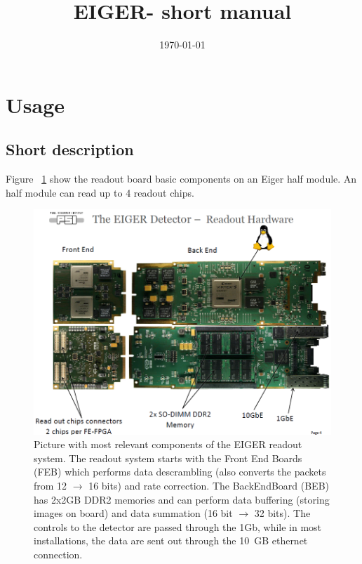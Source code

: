 \documentclass{article}
\newcommand{\E}{EIGER\xspace}
\begin{document}
\title{\E - short manual}
\date{\today}
\maketitle
\tableofcontents

\section{Usage}
\subsection{Short description}
Figure ~\ref{boards} show the readout board basic components on an Eiger half module. An half module can read up to 4 readout chips.  
\begin{figure}[t]
\begin{center}
\includegraphics[width=1\textwidth]{Boards}
\end{center}
\caption{Picture with most relevant components of the EIGER readout system. The readout system starts with the Front End Boards (FEB) which performs data descrambling (also converts the packets from 12 $\to$ 16 bits) and rate correction. The BackEndBoard (BEB) has 2x2GB DDR2 memories and can perform data buffering (storing images on board) and data summation (16 bit $\to$ 32 bits). The controls to the detector are passed through the 1Gb, while in most installations, the data are sent out through the 10~GB ethernet connection.} 
\label{boards}
\end{figure}
\end{document}
